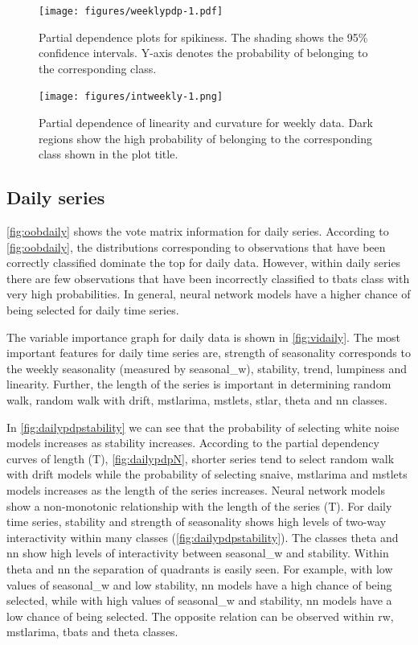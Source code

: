 \documentclass[11pt,a4paper,]{article}
\begin{document}
\begin{figure}
\centering
\texttt{[image: figures/weeklypdp-1.pdf]}
\caption{\label{fig:weeklypdp}Partial dependence plots for spikiness. The shading shows the 95\% confidence intervals. Y-axis denotes the probability of belonging to the corresponding class.}
\end{figure}

\begin{figure}
\centering
\texttt{[image: figures/intweekly-1.png]}
\caption{\label{fig:intweekly}Partial dependence of linearity and curvature for weekly data. Dark regions show the high probability of belonging to the corresponding class shown in the plot title.}
\end{figure}

\hypertarget{daily-series}{%
\subsection{Daily series}\label{daily-series}}

\autoref{fig:oobdaily} shows the vote matrix information for daily series. According to \autoref{fig:oobdaily}, the distributions corresponding to observations that have been correctly classified dominate the top for daily data. However, within daily series there are few observations that have been incorrectly classified to tbats class with very high probabilities. In general, neural network models have a higher chance of being selected for daily time series.

The variable importance graph for daily data is shown in \autoref{fig:vidaily}. The most important features for daily time series are, strength of seasonality corresponds to the weekly seasonality (measured by seasonal\_w), stability, trend, lumpiness and linearity. Further, the length of the series is important in determining random walk, random walk with drift, mstlarima, mstlets, stlar, theta and nn classes.

In \autoref{fig:dailypdpstability} we can see that the probability of selecting white noise models increases as stability increases. According to the partial dependency curves of length (T),
\autoref{fig:dailypdpN}, shorter series tend to select random walk with drift models while the probability of selecting snaive, mstlarima and mstlets models increases as the length of the series increases. Neural network models show a non-monotonic relationship with the length of the series (T). For daily time series, stability and strength of seasonality shows high levels of two-way interactivity within many classes (\autoref{fig:dailypdpstability}). The classes theta and nn show high levels of interactivity between seasonal\_w and stability. Within theta and nn the separation of quadrants is easily seen. For example, with low values of seasonal\_w and low stability, nn models have a high chance of being selected, while with high values of seasonal\_w and stability, nn models have a low chance of being selected. The opposite relation can be observed within rw, mstlarima, tbats and theta classes.
\end{document}
